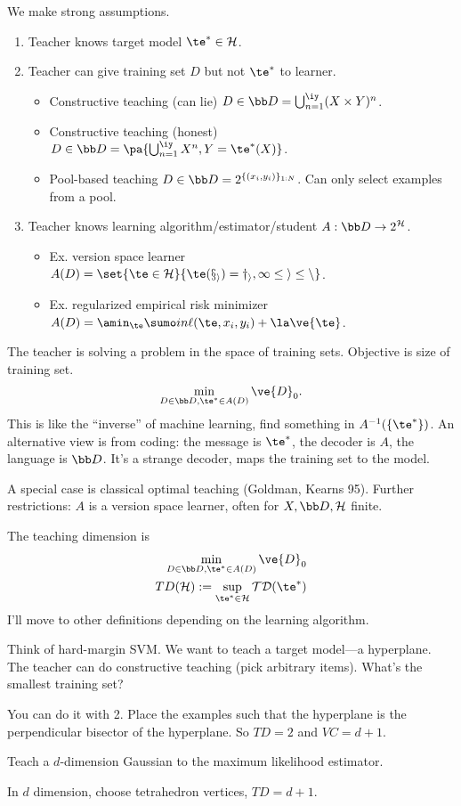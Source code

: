We make strong assumptions.
\begin{enumerate}
\item
Teacher knows target model $\te^*\in \cal H$.
\item
Teacher can give training set $D$ but not $\te^*$ to learner.
\begin{itemize}
\item
Constructive teaching (can lie) $D\in \bb D=\bigcup_{n=1}^{\iy} (X\times Y)^n$.
\item
Constructive teaching (honest) $D\in \bb D=\pa{\bigcup_{n=1}^\iy X^n, Y=\te^*(X)}$.
\item
Pool-based teaching $D\in \bb D = 2^{\{(x_i,y_i)\}_{1:N}}$.  Can only select examples from a pool.
\end{itemize}
\item
Teacher knows learning algorithm/estimator/student $A:\bb D\to 2^{\cal H}$. 
\begin{itemize}
\item
Ex. version space learner $A(D) = \set{\te\in \cal H}{\te(x_i)=y_i,1\le i\le n}$.
\item
Ex. regularized empirical risk minimizer $A(D) = \amin_\te\sumo in \ell(\te,x_i,y_i) + \la\ve{\te}$.
\end{itemize}
\end{enumerate}

The teacher is solving a problem in the space of training sets. Objective is size of training set.
$$
\min_{D\in \bb D, \te^*\in A(D)} \ve{D}_0.
$$
This is like the ``inverse'' of machine learning, find something in $A^{-1}(\{\te^*\})$.
An alternative view is from coding: the message is $\te^*$, the decoder is $A$, the language is $\bb D$. It's a strange decoder, maps the training set to the model.

A special case is classical optimal teaching (Goldman, Kearns 95). Further restrictions: $A$ is a version space learner, often for $X,\bb D, \cal H$ finite.

The teaching dimension is
\begin{align}
\min_{D\in \bb D, \te^*\in A(D)} \ve{D}_0\\
TD(\cal H):=\sup_{\te^*\in \cal H} TD(\te^*)
\end{align}
I'll move to other definitions depending on the learning algorithm.

\begin{ex}
Think of hard-margin SVM. %
We want to teach a target model---a hyperplane. The teacher can do constructive teaching (pick arbitrary items). What's the smallest training set?

You can do it with 2. Place the examples such that the hyperplane is the perpendicular bisector of the hyperplane. So $TD=2$ and $VC=d+1$.
\end{ex}
\begin{ex}
Teach a $d$-dimension Gaussian to the maximum likelihood estimator.

In $d$ dimension, choose tetrahedron vertices, $TD=d+1$.
\end{ex}


